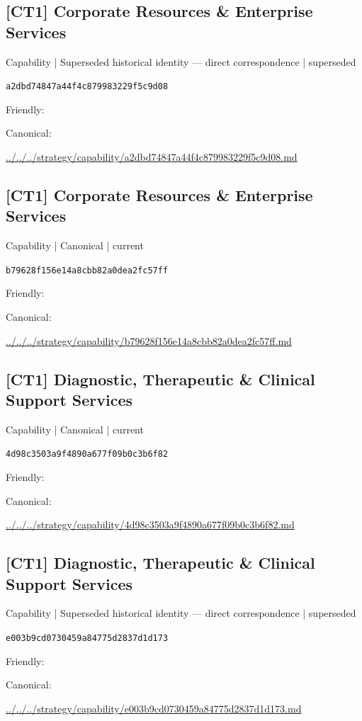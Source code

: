 \documentclass[10pt,a4paper]{article}
\begin{document}
\subsection*{[CT1] Corporate Resources \& Enterprise Services}
{\small Capability | Superseded historical identity — direct correspondence | superseded}\par
\texttt{a2dbd74847a44f4c879983229f5c9d08}\par
Friendly: \par
Canonical: \par
{\footnotesize\url{../../../strategy/capability/a2dbd74847a44f4c879983229f5c9d08.md}}\par
\subsection*{[CT1] Corporate Resources \& Enterprise Services}
{\small Capability | Canonical | current}\par
\texttt{b79628f156e14a8cbb82a0dea2fc57ff}\par
Friendly: \par
Canonical: \par
{\footnotesize\url{../../../strategy/capability/b79628f156e14a8cbb82a0dea2fc57ff.md}}\par
\subsection*{[CT1] Diagnostic, Therapeutic \& Clinical Support Services}
{\small Capability | Canonical | current}\par
\texttt{4d98c3503a9f4890a677f09b0c3b6f82}\par
Friendly: \par
Canonical: \par
{\footnotesize\url{../../../strategy/capability/4d98c3503a9f4890a677f09b0c3b6f82.md}}\par
\subsection*{[CT1] Diagnostic, Therapeutic \& Clinical Support Services}
{\small Capability | Superseded historical identity — direct correspondence | superseded}\par
\texttt{e003b9cd0730459a84775d2837d1d173}\par
Friendly: \par
Canonical: \par
{\footnotesize\url{../../../strategy/capability/e003b9cd0730459a84775d2837d1d173.md}}\par
\end{document}

